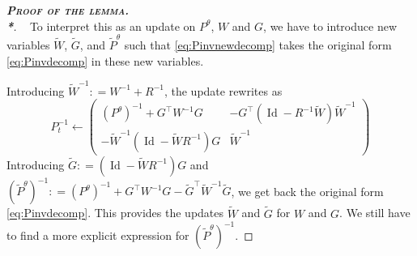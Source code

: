 \documentclass[11pt,a4paper]{article}
\newcommand{\thmheadercommand}[1]{\textbf{\scshape{}#1.\\*}}
\newcommand{\deq}{\mathrel{\mathop{:}}=}
\DeclareMathOperator{\Id}{Id}
\newcommand{\1}{\mathbbm{1}}
\newenvironment{dem}[1][]{\begin{proof}[\thmheadercommand{Proof#1}]~\newline\ignorespaces}{\end{proof}}
\theoremstyle{yannthm}
\theoremstyle{yannthm2}
\newcommand{\transp}[1]{#1^{\!\top}\!}
\newcommand{\Ptheta}{P^\theta}
\numberwithin{equation}{section}
\begin{document}
\begin{dem}[ of the lemma]
To interpret this as an update on $\Ptheta$, $W$ and $G$, we have to
introduce new variables $\tilde W$, $\tilde G$, and $\tilde \Ptheta$ such
that \eqref{eq:Pinvnewdecomp} takes the original form
\eqref{eq:Pinvdecomp} in these new variables.

Introducing $\tilde W^{-1}\deq W^{-1}+R^{-1}$, 
the update rewrites as
\begin{equation}
P_t^{-1}\gets 
\begin{pmatrix}
(\Ptheta)^{-1}+\transp{G}W^{-1}G & -\transp{G} (\Id -R^{-1}\tilde
W)\tilde W^{-1}
\\
-\tilde W^{-1}(\Id - \tilde WR^{-1})G & \tilde W^{-1}
\end{pmatrix}
\end{equation}
Introducing $\tilde G\deq (\Id-\tilde WR^{-1})G$ and $(\tilde
\Ptheta)^{-1}\deq (\Ptheta)^{-1}+\transp{G}W^{-1}G-\transp{\tilde
G}\tilde W^{-1}\tilde G$, we get back the original form
\eqref{eq:Pinvdecomp}. This provides the updates $\tilde W$ and
$\tilde G$ for $W$ and $G$. We
still have to find a more explicit expression for $(\tilde
\Ptheta)^{-1}$.%


\end{dem}
\end{document}
